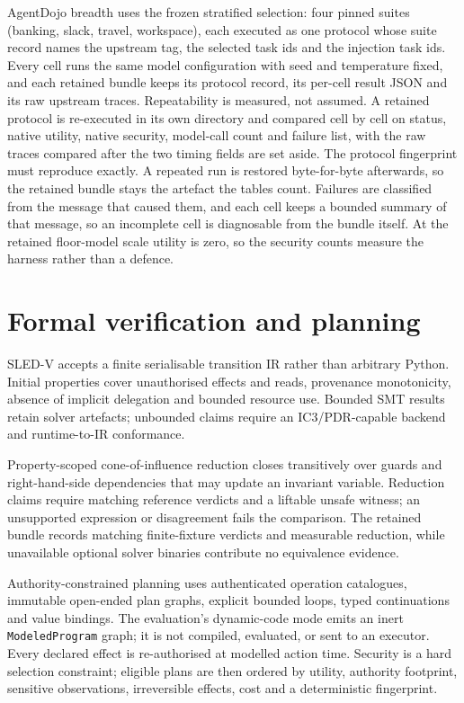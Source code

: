 \documentclass[11pt]{article}
\begin{document}
AgentDojo breadth uses the frozen stratified selection: four pinned suites
(banking, slack, travel, workspace), each executed as one protocol whose suite
record names the upstream tag, the selected task ids and the injection task
ids. Every cell runs the same model configuration with seed and temperature
fixed, and each retained bundle keeps its protocol record, its per-cell result
JSON and its raw upstream traces. Repeatability is measured, not assumed. A
retained protocol is re-executed in its own directory and compared cell by cell
on status, native utility, native security, model-call count and failure list,
with the raw traces compared after the two timing fields are set aside. The
protocol fingerprint must reproduce exactly. A repeated run is restored
byte-for-byte afterwards, so the retained bundle stays the artefact the tables
count. Failures are classified from the message that caused them, and each
cell keeps a bounded summary of that message, so an incomplete cell is
diagnosable from the bundle itself. At the retained floor-model scale utility
is zero, so the security counts measure the harness rather than a defence.

\section{Formal verification and planning}
SLED-V accepts a finite serialisable transition IR rather than arbitrary
Python. Initial properties cover unauthorised effects and reads, provenance
monotonicity, absence of implicit delegation and bounded resource use. Bounded
SMT results retain solver artefacts; unbounded claims require an
IC3/PDR-capable backend and runtime-to-IR conformance.

Property-scoped cone-of-influence reduction closes transitively over guards and
right-hand-side dependencies that may update an invariant variable. Reduction
claims require matching reference verdicts and a liftable unsafe witness; an
unsupported expression or disagreement fails the comparison. The retained
bundle records matching finite-fixture verdicts and measurable reduction, while
unavailable optional solver binaries contribute no equivalence evidence.

Authority-constrained planning uses authenticated operation catalogues,
immutable open-ended plan graphs, explicit bounded loops, typed continuations
and value bindings. The evaluation's dynamic-code mode emits an inert
\texttt{ModeledProgram} graph; it is not compiled, evaluated, or sent to an
executor. Every declared effect is re-authorised at modelled action time.
Security is a hard selection constraint;
eligible plans are then ordered by utility, authority footprint, sensitive
observations, irreversible effects, cost and a deterministic fingerprint.
\end{document}
